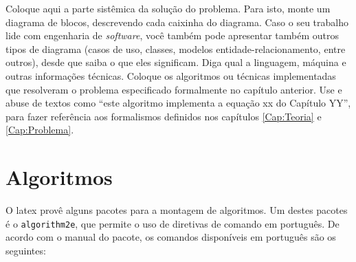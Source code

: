 
\label{Cap:Implementacao}

Coloque aqui a parte sistêmica da solução do problema. Para isto, monte um diagrama de blocos, descrevendo cada caixinha do diagrama. Caso o seu trabalho lide com engenharia de \textit{software}, você também pode apresentar também outros tipos de diagrama (casos de uso, classes, modelos entidade-relacionamento, entre outros), desde que saiba o que eles significam. Diga qual a linguagem, máquina e outras informações técnicas. Coloque os algoritmos ou técnicas implementadas que resolveram o problema especificado formalmente no capítulo anterior. Use e abuse de textos como ``este algoritmo implementa a equação xx do Capítulo YY'', para fazer referência aos formalismos definidos nos capítulos \ref{Cap:Teoria} e \ref{Cap:Problema}.

\section{Algoritmos}
\label{Sec:algoritmos}

O latex provê alguns pacotes para a montagem de algoritmos. Um destes pacotes é o \texttt{algorithm2e}, que permite o uso de diretivas de comando em português. De acordo com o manual do pacote, os comandos disponíveis em português são os seguintes:


